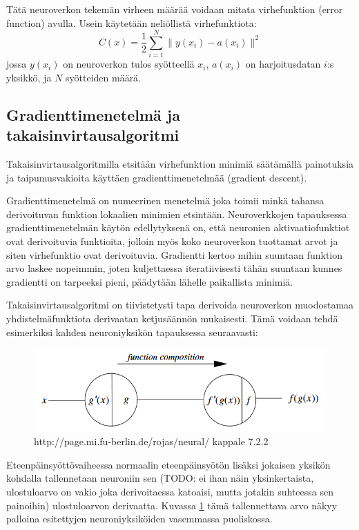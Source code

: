 \documentclass[finnish]{tktltiki2}
\theoremstyle{definition}
\theoremstyle{remark}
\begin{document}
  Tätä neuroverkon tekemän virheen määrää voidaan mitata virhefunktion (error function) avulla. Usein käytetään neliöllistä virhefunktiota:
    $$C(x) = \frac{1}{2} \sum_{i=1}^{N} \| y(x_i)-a(x_i) \|^2$$
  jossa $y(x_i)$ on neuroverkon tulos syötteellä $x_i$, $a(x_i)$ on harjoitusdatan $i$:s yksikkö, ja $N$ syötteiden määrä.


  \subsection{Gradienttimenetelmä ja takaisinvirtausalgoritmi}

  Takaisinvirtausalgoritmilla etsitään virhefunktion minimiä säätämällä painotuksia ja taipumusvakioita käyttäen gradienttimenetelmää (gradient descent).

  Gradienttimenetelmä on numeerinen menetelmä joka toimii minkä tahansa derivoituvan funktion lokaalien minimien etsintään. Neuroverkkojen tapauksessa gradienttimenetelmän käytön edellytyksenä on, että neuronien aktivaatiofunktiot ovat derivoituvia funktioita, jolloin myös koko neuroverkon tuottamat arvot ja siten virhefunktio ovat derivoituvia. Gradientti kertoo mihin suuntaan funktion arvo laskee nopeimmin, joten kuljettaessa iteratiivisesti tähän suuntaan kunnes gradientti on tarpeeksi pieni, päädytään lähelle paikallista minimiä.

  Takaisinvirtausalgoritmi on tiivistetysti tapa derivoida neuroverkon muodostamaa yhdistelmäfunktiota derivaatan ketjusäännön mukaisesti. Tämä voidaan tehdä esimerkiksi kahden neuroniyksikön tapauksessa seuraavasti: 
  
  \begin{figure}[h]
    \label{pic:composition}
    \centering
    \includegraphics[scale=0.5]{function-composition}
    \caption{http://page.mi.fu-berlin.de/rojas/neural/ kappale 7.2.2}
  \end{figure}
  
  Eteenpäinsyöttövaiheessa normaalin eteenpäinsyötön lisäksi jokaisen yksikön kohdalla tallennetaan neuroniin sen (TODO: ei ihan näin yksinkertaista, ulostuloarvo on vakio joka derivoitaessa katoaisi, mutta jotakin suhteessa sen painoihin) ulostuloarvon derivaatta. Kuvassa \ref{pic:composition} tämä tallennettava arvo näkyy palloina esitettyjen neuroniyksiköiden vasemmassa puoliskossa.
\end{document}
